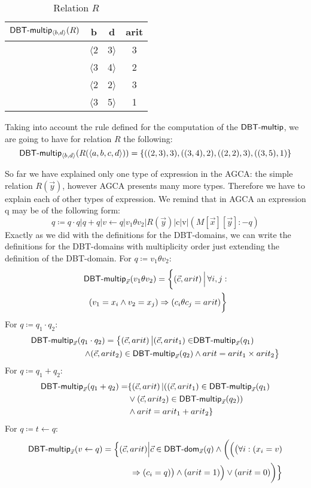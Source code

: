 \documentclass[12pt]{article}
\begin{document}
\begin{table}[H]
\centering
\begin{tabular}{c c c c}
	$\textsf{DBT-multip}{}_{\langle b,d\rangle}(R)$ & b & d & arit \\ [0.2ex]
	\hline
	  & $\langle $2 & 3$\rangle$ & 3\\
	  & $\langle $3 & 4$\rangle$ & 2\\
	  & $\langle $2 & 2$\rangle$ & 3\\
	  & $\langle $3 & 5$\rangle$ & 1\\
\end{tabular}
\caption{Relation $R$}
\end{table}

Taking into account the rule defined for the computation of the $\textsf{DBT-multip}{}$, we are going to have for relation $R$ the following:
$$\textsf{DBT-multip}{}_{\langle b,d\rangle}(R(\langle a,b,c,d\rangle))=\{((2,3),3),((3,4),2),((2,2),3),((3,5),1)\}$$

So far we have explained only one type of expression in the AGCA: the simple relation $R(\vec y)$, however AGCA presents many more types. Therefore we have to explain each of other types of expression. We remind that in AGCA an expression q may be of the following form:
\begin{equation}
q\coloneqq q\cdot q | q + q|v \gets q |v_{1}\theta v_{2}|R(\vec{y})|\text{c}|\text{v}|(M[\vec{x}][\vec{y}]:-q)
\end{equation}
Exactly as we did with the definitions for the DBT-domains, we can write the definitions for the DBT-domains with multiplicity order just extending the definition of the DBT-domain. For $q\coloneqq v_{1}\theta v_{2}$:
\begin{align}
\text{\textsf{DBT-multip}{}}_{\vec{x}}(v_{1}\theta v_{2})=\bigg\{(\vec{c},arit)\,\Big|\,\forall i,j:\nonumber\\(v_{1}=x_{i}\land v_{2}=x_{j})\Rightarrow (c_{i}\theta c_{j}=arit)\bigg\}
\end{align}
For $q\coloneqq q_{1}\cdot q_{2}$:
\begin{align} 
\text{\textsf{DBT-multip}}_{\vec{x}}(q_{1}\cdot q_{2})=\big\{(\vec{c},arit)\,\big|(\vec{c},arit_{1})\in&\text{\textsf{DBT-multip}}_{\vec{x}}(q_{1})\nonumber\\\land (\vec{c},arit_{2})\in\text{\textsf{DBT-multip}{}}_{\vec{x}}(q_{2})& \land arit= arit_{1}\times arit_{2}\big\}
\end{align}
For $q\coloneqq q_{1}+q_{2}$:
\begin{align}
\text{\textsf{DBT-multip}{}}_{\vec{x}}(q_{1}+ q_{2})=&\{(\vec{c},arit)\,|((\vec{c},arit_{1})\in\text{\textsf{DBT-multip}{}}_{\vec{x}}(q_{1})\nonumber\\&\lor(\vec{c},arit_{2})\in\text{\textsf{DBT-multip}{}}_{\vec{x}}(q_{2}))\nonumber\\&\land arit=arit_{1}+arit_{2}\}
\end{align}
For $q\coloneqq t\gets q$:
\begin{align}
\text{\textsf{DBT-multip}{}}_{\vec{x}}(v\gets q)=\Big\{(\vec{c},arit)\Big|\vec{c}\in\text{\textsf{DBT-dom}{}}_{\vec{x}}(q)\land \bigg(\Big(\big(\forall i: (x_{i}=v) & \nonumber\\\Rightarrow(c_{i}=q)\big)\land (arit=1)\Big)\lor (arit=0)\bigg)\Big\}
\end{align}
\end{document}
